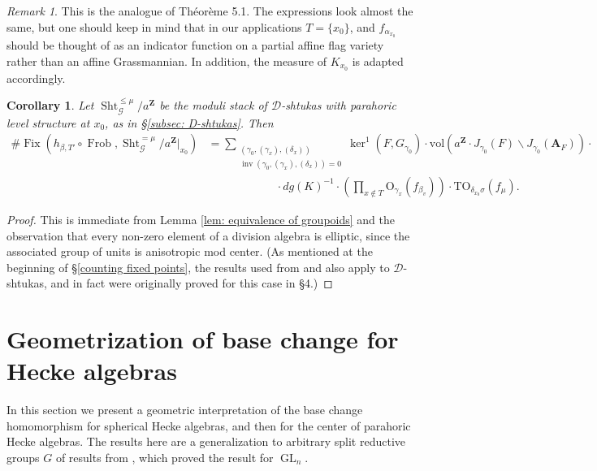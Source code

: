 \documentclass[reqno]{amsart}
\numberwithin{equation}{section}
\newcommand{\Z}{\mathbf{Z}}
\newcommand{\Cal}[1]{\mathcal{#1}}
\newcommand{\A}{\mathbf{A}}
\newcommand{\mrm}[1]{\mathrm{#1}}
\DeclareMathOperator{\GL}{GL}
\DeclareMathOperator{\Frob}{Frob}
\DeclareMathOperator{\inv}{inv}
\DeclareMathOperator{\Fix}{Fix}
\DeclareMathOperator{\Sht}{Sht}
\newtheorem{cor}[thm]{Corollary}
\theoremstyle{remark}
\newtheorem{remark}[thm]{Remark}
\numberwithin{equation}{section}
\begin{document}
\begin{remark}
This is the analogue of \cite{Ngo13} Th\'{e}or\`{e}me 5.1. The expressions look almost the same, but one should keep in mind that in our applications  $T = \{x_0\}$, and $f_{\alpha_{x_0}}$ should be thought of as an indicator function on a partial affine flag variety rather than an affine Grassmannian. In addition, the measure of $K_{x_0}$ is adapted accordingly. 
\end{remark}



\begin{cor}\label{cor: number fixed point formula}
Let $\Sht_{\Cal{G}}^{\leq \mu}/a^{\Z}$ be the moduli stack of $\Cal{D}$-shtukas with parahoric level structure at $x_0$, as in \S \ref{subsec: D-shtukas}. Then 
\begin{align*}
\# \Fix(h_{\beta,T'} \circ \Frob, \Sht_{\Cal{G}}^{= \mu}/a^{\Z}|_{x_0})  &= \sum_{\substack{ (\gamma_0, (\gamma_x),(\delta_x)) \\ \inv(\gamma_0, (\gamma_x),(\delta_x) ) = 0}}
\ker^1(F, G_{\gamma_0}) \cdot \mrm{vol}(a^{\Z} \cdot J_{\gamma_0}(F)  \backslash J_{\gamma_0} (\A_F)) \cdot \\ 
& \hspace{1in}\cdot dg(K)^{-1} \cdot \left( \prod_{x \notin T} \mrm{O}_{\gamma_x}(f_{\beta_v})   \right) \cdot \mrm{TO}_{\delta_{x_0} \sigma}(f_{\mu}). 
\end{align*}
\end{cor}

\begin{proof}
This is immediate from Lemma \ref{lem: equivalence of groupoids} and the observation that every non-zero element of a division algebra is elliptic, since the associated group of units is anisotropic mod center. (As mentioned at the beginning of \S \ref{counting fixed points}, the results used from \cite{NgoNgo} and \cite{Ngo13} also apply to $\Cal{D}$-shtukas, and in fact were originally proved for this case in \cite{Ngo06} \S 4.) 
\end{proof}


\section{Geometrization of base change for Hecke algebras} \label{hecke base change}

In this section we present a geometric interpretation of the base change homomorphism for spherical Hecke algebras, and then for the center of parahoric Hecke algebras. The results here are a generalization to arbitrary split reductive groups $G$ of results from \cite{Ngo99}, which proved the result for $\GL_n$. 
\end{document}
